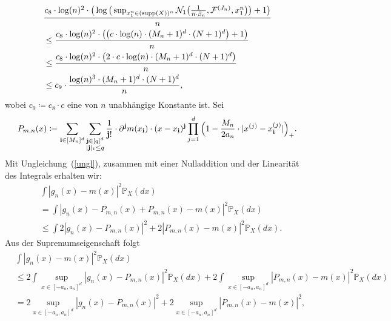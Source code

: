 \begin{equation}
\label{lem9sol}
\begin{split}
& \frac{c_8 \cdot \log(n)^2 \cdot \big(\log\big(\sup_{x_1^n \in (\operatorname{supp}(X))^n}\mathcal{N}_1\big(\frac{1}{n \cdot \beta_n},\mathcal{F}^{(J_n)},x_1^n\big)\big) + 1\big)}{n} \\
& \leq \frac{c_8 \cdot \log(n)^2 \cdot \big(\big(c \cdot \log(n) \cdot (M_n + 1)^d \cdot (N + 1)^d \big) + 1\big)}{n} \\
& \leq \frac{c_8 \cdot \log(n)^2 \cdot \big(2 \cdot c \cdot \log(n) \cdot (M_n + 1)^d \cdot (N + 1)^d\big)}{n} \\
& \leq c_{9} \cdot \frac{\log(n)^3 \cdot (M_n + 1)^d \cdot (N + 1)^d}{n},
\end{split}
\end{equation}
wobei $c_9 \coloneqq c_8 \cdot c$ eine von $n$ unabhängige Konstante ist.
Sei 
\begin{equation*}
\begin{split}
P_{m,n}(x) \coloneqq \sum_{\mathbf{i} \in [M_n]^d} \sum_{\substack{ \mathbf{j} \in [q]^d \\ |\mathbf{j}|_1 \leq q}} \frac{1}{\mathbf{j}!} \cdot \partial^{\mathbf{j}} m (x_{\mathbf{i}}) \cdot (x - x_{\mathbf{i}})^{\mathbf{j}} \prod_{j = 1}^d\Big(1 - \frac{M_n}{2a_n} \cdot |x^{(j)} - x_{\mathbf{i}}^{(j)}|\Big)_+. 
\end{split}
\end{equation*}
Mit Ungleichung~(\ref{ungl}), zusammen mit einer Nulladdition und der Linearität des Integrals erhalten wir:
\begin{equation*}
\begin{split}
& \int |g_n(x) - m(x)|^2 \mathds{P}_X(dx) \\
& = \int |g_n(x) - P_{m,n}(x) + P_{m,n}(x) - m(x)|^2 \mathds{P}_X(dx) \\
& \leq \int 2 |g_n(x) - P_{m,n}(x)|^2 + 2 |P_{m,n}(x) - m(x)|^2 \mathds{P}_X(dx).
\end{split}
\end{equation*}
Aus der Supremumseigenschaft folgt
\begin{equation}
\label{gnmx}
\begin{split}
& \int |g_n(x) - m(x)|^2 \mathds{P}_X(dx) \\
& \leq 2 \int \sup_{x \in [-a_n, a_n]^d} |g_n(x) - P_{m,n}(x)|^2 \mathds{P}_X(dx) + 2 \int \sup_{x \in [-a_n, a_n]^d} |P_{m,n}(x) - m(x)|^2 \mathds{P}_X(dx) \\
& = 2 \sup_{x \in [-a_n, a_n]^d} |g_n(x) - P_{m,n}(x)|^2 + 2 \sup_{x \in [-a_n, a_n]^d} |P_{m,n}(x) - m(x)|^2, 
\end{split}
\end{equation}

